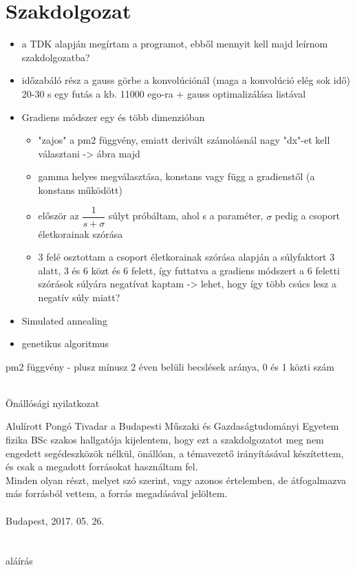 \documentclass[12pt]{article}
\begin{document}
\section*{Szakdolgozat}
\begin{itemize}
	\item a TDK alapján megírtam a programot, ebből mennyit kell majd leírnom szakdolgozatba?
	\item időzabáló rész a gauss görbe a konvolúciónál (maga a konvolúció elég sok idő) 20-30 s egy futás a kb. 11000 ego-ra + gauss optimalizálása listával
	\item Gradiens módszer egy és több dimenzióban
	\begin{itemize}
		\item "zajos" a pm2 függvény, emiatt derivált számolásnál nagy "dx"-et kell választani -> ábra majd
		\item gamma helyes megválasztása, konstans vagy függ a gradienstől (a konstans működött)
		\item először az $\dfrac{1}{s + \sigma}$ súlyt próbáltam, ahol s a paraméter, $\sigma$ pedig a csoport életkorainak szórása
		\item 3 felé osztottam a csoport életkorainak szórása alapján a súlyfaktort 3 alatt, 3 és 6 közt és 6 felett, így futtatva a gradiens módszert a 6 feletti szórások súlyára negatívat kaptam -> lehet, hogy így több csúcs lesz a negatív súly miatt?
	\end{itemize}
	\item Simulated annealing
	\item genetikus algoritmus
\end{itemize}
pm2 függvény - plusz mínusz 2 éven belüli becslések aránya, 0 és 1 közti szám \\ \\
\fi


\pagebreak
\begin{center}
	{\Huge Önállósági nyilatkozat}
\end{center}
\medskip
Alulírott Pongó Tivadar a Budapesti Műszaki és Gazdaságtudományi Egyetem fizika BSc szakos hallgatója kijelentem, hogy ezt a szakdolgozatot meg nem engedett segédeszközök nélkül, önállóan, a témavezető irányításával készítettem, és csak a megadott forrásokat használtam fel. \\
Minden olyan részt, melyet szó szerint, vagy azonos értelemben, de átfogalmazva más forrásból vettem, a forrás megadásával jelöltem.\\\\
Budapest, 2017. 05. 26. \\ \\ \\ %
\hspace*{100mm}aláírás %
\pagebreak
\tableofcontents
\pagebreak
\end{document}
